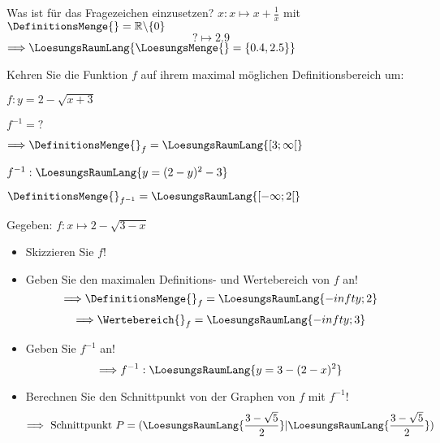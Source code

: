 \begin{bbwAufgabenBlock}
\item Was ist für das Fragezeichen einzusetzen? $x: x \mapsto x+\frac1x$ mit $\DefinitionsMenge{}
= \mathbb{R}\backslash \{0\}$
$$? \mapsto 2.9$$
$\Longrightarrow \LoesungsRaumLang{\LoesungsMenge{} = \{0.4, 2.5\}}$

\item Kehren Sie die Funktion $f$ auf ihrem maximal möglichen
Definitionsbereich um:

$f: y=2-\sqrt{x+3}$

$f^{-1} = ?$


$\Longrightarrow \DefinitionsMenge{}_f = \LoesungsRaumLang{[3;\infty[}$

$f^{-1}: \LoesungsRaumLang{y = (2-y)^2 - 3}$

$\DefinitionsMenge{}_{f^{-1}} = \LoesungsRaumLang{[-\infty; 2[}$


\item Gegeben: $f: x\mapsto 2-\sqrt{3-x}$

\begin{itemize}
\item Skizzieren Sie $f$!
\item Geben Sie den maximalen Definitions- und Wertebereich von $f$ an!
  $$\Longrightarrow \DefinitionsMenge{}_f = \LoesungsRaumLang{-infty;2}$$
  $$\Longrightarrow \Wertebereich{}_f = \LoesungsRaumLang{-infty;3}$$
\item Geben Sie $f^{-1}$ an!
  $$\Longrightarrow f^{-1}: \LoesungsRaumLang{y=3-(2-x)^2}$$
\item Berechnen Sie den Schnittpunkt von der Graphen von $f$ mit
$f^{-1}$!
  $$\Longrightarrow \textrm{ Schnittpunkt } P=(\LoesungsRaumLang{\frac{3-\sqrt{5}}2}|\LoesungsRaumLang{\frac{3-\sqrt{5}}2})$$

\end{itemize}
\end{bbwAufgabenBlock}

\platzFuerBerechnungenBisEndeSeite{}


\platzFuerBerechnungenBisEndeSeite{}



